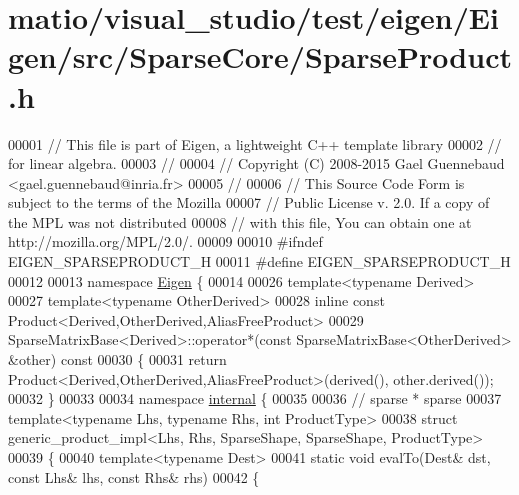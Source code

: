 \hypertarget{matio_2visual__studio_2test_2eigen_2_eigen_2src_2_sparse_core_2_sparse_product_8h_source}{}\section{matio/visual\+\_\+studio/test/eigen/\+Eigen/src/\+Sparse\+Core/\+Sparse\+Product.h}
\label{matio_2visual__studio_2test_2eigen_2_eigen_2src_2_sparse_core_2_sparse_product_8h_source}

\begin{DoxyCode}
00001 \textcolor{comment}{// This file is part of Eigen, a lightweight C++ template library}
00002 \textcolor{comment}{// for linear algebra.}
00003 \textcolor{comment}{//}
00004 \textcolor{comment}{// Copyright (C) 2008-2015 Gael Guennebaud <gael.guennebaud@inria.fr>}
00005 \textcolor{comment}{//}
00006 \textcolor{comment}{// This Source Code Form is subject to the terms of the Mozilla}
00007 \textcolor{comment}{// Public License v. 2.0. If a copy of the MPL was not distributed}
00008 \textcolor{comment}{// with this file, You can obtain one at http://mozilla.org/MPL/2.0/.}
00009 
00010 \textcolor{preprocessor}{#ifndef EIGEN\_SPARSEPRODUCT\_H}
00011 \textcolor{preprocessor}{#define EIGEN\_SPARSEPRODUCT\_H}
00012 
00013 \textcolor{keyword}{namespace }\hyperlink{namespace_eigen}{Eigen} \{ 
00014 
00026 \textcolor{keyword}{template}<\textcolor{keyword}{typename} Derived>
00027 \textcolor{keyword}{template}<\textcolor{keyword}{typename} OtherDerived>
00028 \textcolor{keyword}{inline} \textcolor{keyword}{const} Product<Derived,OtherDerived,AliasFreeProduct>
00029 SparseMatrixBase<Derived>::operator*(\textcolor{keyword}{const} SparseMatrixBase<OtherDerived> &other)\textcolor{keyword}{ const}
00030 \textcolor{keyword}{}\{
00031   \textcolor{keywordflow}{return} Product<Derived,OtherDerived,AliasFreeProduct>(derived(), other.derived());
00032 \}
00033 
00034 \textcolor{keyword}{namespace }\hyperlink{namespaceinternal}{internal} \{
00035 
00036 \textcolor{comment}{// sparse * sparse}
00037 \textcolor{keyword}{template}<\textcolor{keyword}{typename} Lhs, \textcolor{keyword}{typename} Rhs, \textcolor{keywordtype}{int} ProductType>
00038 \textcolor{keyword}{struct }generic\_product\_impl<Lhs, Rhs, SparseShape, SparseShape, ProductType>
00039 \{
00040   \textcolor{keyword}{template}<\textcolor{keyword}{typename} Dest>
00041   \textcolor{keyword}{static} \textcolor{keywordtype}{void} evalTo(Dest& dst, \textcolor{keyword}{const} Lhs& lhs, \textcolor{keyword}{const} Rhs& rhs)
00042   \{

\end{DoxyCode}
